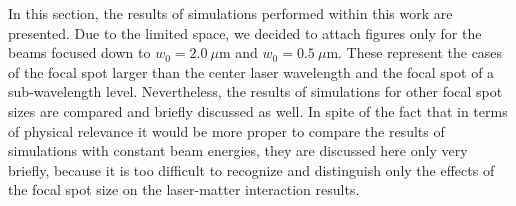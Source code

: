In this section, the results of simulations performed within this work are presented. Due to the limited space, we decided to attach figures only for the beams focused down to $ w_0 = 2.0 \ \mu\mathrm{m} $ and $ w_0 = 0.5 \ \mu\mathrm{m} $. These represent the cases of the focal spot larger than the center laser wavelength and the focal spot of a sub-wavelength level. Nevertheless, the results of simulations for other focal spot sizes are compared and briefly discussed as well. In spite of the fact that in terms of physical relevance it would be more proper to compare the results of simulations with constant beam energies, they are discussed here only very briefly, because it is too difficult to recognize and distinguish only the effects of the focal spot size on the laser-matter interaction results.

